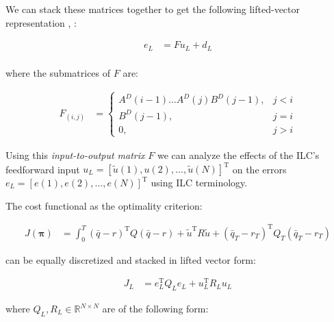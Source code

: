 \documentclass[10pt,a4paper]{article}
\newcommand{\joint}{q} %
\newcommand{\state}{\bar{\joint}} %
\newcommand{\error}{e} %
\newcommand{\traj}{r} %
\newcommand{\linDist}{d} %
\newcommand{\sysInput}{u} %
\newcommand{\linInput}{\tilde{u}} %
\newcommand{\policy}{\mathbf{\pi}}
\newcommand{\ValueFunction}{J}
\newcommand{\numSteps}{N} %
\begin{document}
We can stack these matrices together to get the following lifted-vector representation \cite{Bristow06}, \cite{Schoellig12}:

\begin{equation}
\begin{aligned}
\error_L &= F\sysInput_L + \linDist_L \\
\end{aligned}
\label{liftedLTV}
\end{equation}

where the submatrices of $F$ are:

\begin{equation*}
\begin{aligned}
F_{(i,j)} &= \left \{
\begin{array}{cc}
A^{D}(i-1)\ldots A^{D}(j)B^{D}(j-1), & j < i \\ 
B^{D}(j-1), & j = i \\
0, & j > i 
\end{array} \right.
\end{aligned}
\end{equation*}

Using this \emph{input-to-output matrix} $F$ we can analyze the effects of the ILC's feedforward input $\sysInput_L = [\linInput(1), \sysInput(2), \ldots, \linInput(\numSteps)]^{\mathrm{T}}$ on the errors $\error_L = [\error(1), \error(2),\ldots,\error(\numSteps)]^{\mathrm{T}}$ using ILC terminology.

The cost functional as the optimality criterion:

\begin{equation}
\begin{aligned}
\ValueFunction(\policy) &= \int_{0}^{T} (\state - \traj)^{\mathrm{T}}Q(\state - \traj) + \linInput^{\mathrm{T}}R\linInput + (\state_T-\traj_T)^{\mathrm{T}}Q_{T}(\state_T-\traj_T)
\end{aligned}
\label{cost}
\end{equation}

can be equally discretized and stacked in lifted vector form:

\begin{equation}
\begin{aligned}
\ValueFunction_L &= \error_L^{\mathrm{T}}Q_L\error_L + \sysInput_L^{\mathrm{T}}R_L\sysInput_L
\end{aligned}
\label{costFunctional}
\end{equation}

where $Q_L, R_L \in \mathbb{R}^{N \times N}$ are of the following form:
\end{document}
